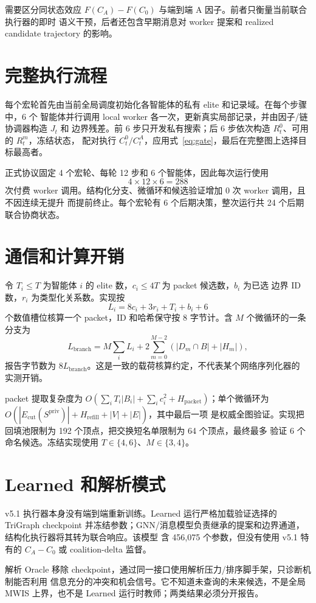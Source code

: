 需要区分同状态效应 $F(C_A)-F(C_0)$ 与端到端 A 因子。前者只衡量当前联合执行器的即时
语义干预，后者还包含早期消息对 worker 提案和 realized candidate trajectory 的影响。

\section{完整执行流程}

每个宏轮首先由当前全局调度初始化各智能体的私有 elite 和记录域。在每个步骤中，6 个
智能体并行调用 local worker 各一次，更新真实局部记录，并由因子/链协调器构造 $J_t$ 和
边界残差。前 6 步只开发私有搜索；后 6 步依次构造 $R_t^0$、可用的 $R_t^m$，冻结状态，
配对执行 $C_t^0/C_t^A$，应用式~\eqref{eq:gate}，最后在完整图上选择目标最高者。

正式协议固定 4 个宏轮、每轮 12 步和 6 个智能体，因此每次运行使用
\begin{equation}
4\times 12\times 6=288
\end{equation}
次付费 worker 调用。结构化分支、微循环和候选验证增加 0 次 worker 调用，且不因连续无提升
而提前终止。每个宏轮有 6 个后期决策，整次运行共 24 个后期联合协商状态。

\section{通信和计算开销}

令 $T_i\le T$ 为智能体 $i$ 的 elite 数，$c_i\le4T$ 为 packet 候选数，$b_i$ 为已选
边界 ID 数，$r_i$ 为类型化关系数。实现按
\begin{equation}
L_i=8c_i+3r_i+T_i+b_i+6
\end{equation}
个数值槽位核算一个 packet，ID 和哈希保守按 8 字节计。含 $M$ 个微循环的一条分支为
\begin{equation}
L_{\mathrm{branch}}=M\sum_iL_i+2\sum_{m=0}^{M-2}
\left(|D_m\cap B|+|H_m|\right),
\end{equation}
报告字节数为 $8L_{\mathrm{branch}}$。这是一致的载荷核算约定，不代表某个网络序列化器的
实测开销。

packet 提取复杂度为
$O(\sum_iT_i|B_i|+\sum_ic_i^2+H_{\mathrm{packet}})$；单个微循环为
$O(|E_{\mathrm{cut}}(S^{\mathrm{priv}})|+H_{\mathrm{refill}}+|V|+|E|)$，其中最后一项
是权威全图验证。实现把回填池限制为 192 个顶点，把交换短名单限制为 64 个顶点，最终最多
验证 6 个命名候选。冻结实现使用 $T\in\{4,6\}$、$M\in\{3,4\}$。

\section{Learned 和解析模式}

v5.1 执行器本身没有端到端重新训练。Learned 运行严格加载验证选择的 TriGraph checkpoint
并冻结参数；GNN/消息模型负责继承的提案和边界通道，结构化执行器将其转为联合响应。该模型
含 456,075 个参数，但没有使用 v5.1 特有的 $C_A-C_0$ 或 coalition-delta 监督。

解析 Oracle 移除 checkpoint，通过同一接口使用解析压力/排序脚手架，只诊断机制能否利用
信息充分的冲突和机会信号。它不知道未查询的未来候选，不是全局 MWIS 上界，也不是 Learned
运行时教师；两类结果必须分开报告。
